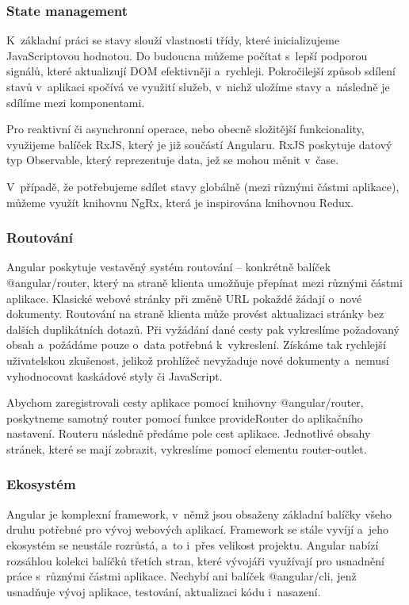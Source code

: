 \subsubsection{State management}

K~základní práci se stavy slouží vlastnosti třídy, které inicializujeme JavaScriptovou hodnotou. 
Do budoucna můžeme počítat s~lepší podporou signálů, které aktualizují DOM efektivněji a~rychleji. 
Pokročilejší způsob sdílení stavů v~aplikaci spočívá ve využití služeb, v~nichž uložíme stavy a~následně je sdílíme mezi komponentami.\cite{angulardev}

Pro reaktivní či asynchronní operace, nebo obecně složitější funkcionality, využijeme balíček RxJS, který je již součástí Angularu. 
RxJS poskytuje datový typ Observable, který reprezentuje data, jež se mohou měnit v~čase.\cite{angulario,rxjslibrary}

V~případě, že potřebujeme sdílet stavy globálně (mezi různými částmi aplikace), můžeme využít knihovnu NgRx, která je inspirována knihovnou Redux.\cite{angularstatemanagement,ngrxlib}

\subsubsection{Routování}

Angular poskytuje vestavěný systém routování -- konkrétně balíček @angular/router, který na straně klienta umožňuje přepínat mezi různými částmi aplikace. 
Klasické webové stránky při změně URL pokaždé žádají o~nové dokumenty. Routování na straně klienta může provést aktualizaci stránky bez dalších duplikátních dotazů. 
Při vyžádání dané cesty pak vykreslíme požadovaný obsah a~požádáme pouze o~data potřebná k~vykreslení. 
Získáme tak rychlejší uživatelskou zkušenost, jelikož prohlížeč nevyžaduje nové dokumenty a~nemusí vyhodnocovat kaskádové styly či JavaScript.

Abychom zaregistrovali cesty aplikace pomocí knihovny @angular/router, poskytneme samotný router pomocí funkce provideRouter do aplikačního nastavení. 
Routeru následně předáme pole cest aplikace. Jednotlivé obsahy stránek, které se mají zobrazit, vykreslíme pomocí elementu router-outlet.\cite{angulardev,learningangular}

\subsubsection{Ekosystém}

Angular je komplexní framework, v~němž jsou obsaženy základní balíčky všeho druhu potřebné pro vývoj webových aplikací. 
Framework se stále vyvíjí a~jeho ekosystém se neustále rozrůstá, a~to i~přes velikost projektu. 
Angular nabízí rozsáhlou kolekci balíčků třetích stran, které vývojáři využívají pro usnadnění práce s~různými částmi aplikace. 
Nechybí ani balíček @angular/cli, jenž usnadňuje vývoj aplikace, testování, aktualizaci kódu i~nasazení.\cite{angulardev,learningangular}